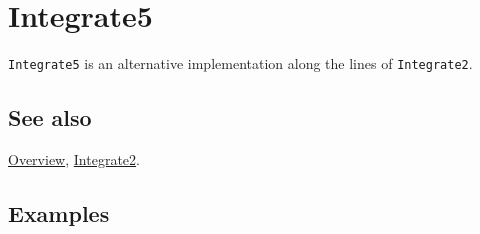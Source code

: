 \documentclass[../FeynCalcManual.tex]{subfiles}
\begin{document}
\hypertarget{integrate5}{%
\section{Integrate5}\label{integrate5}}

\texttt{Integrate5} is an alternative implementation along the lines of
\texttt{Integrate2}.

\subsection{See also}

\hyperlink{toc}{Overview}, \hyperlink{integrate2}{Integrate2}.

\subsection{Examples}
\end{document}
